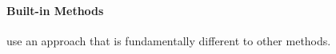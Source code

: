 \paragraph{Built-in Methods}
\label{par:methods.flat.embedded.builtin}

  
use an approach that is fundamentally different to other
methods.
